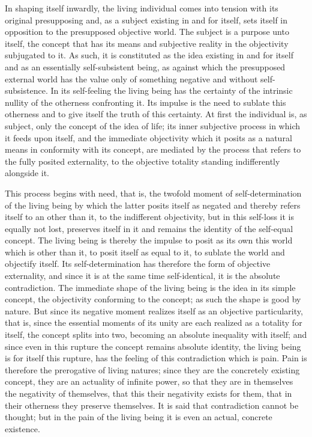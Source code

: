 In shaping itself inwardly, the living individual
comes into tension with its original presupposing
and, as a subject existing in and for itself,
sets itself in opposition to the presupposed objective world.
The subject is a purpose unto itself,
the concept that has its means and subjective reality
in the objectivity subjugated to it.
As such, it is constituted as the idea existing in and for itself
and as an essentially self-subsistent being,
as against which the presupposed external world
has the value only of something negative
and without self-subsistence.
In its self-feeling the living being
has the certainty of the intrinsic nullity
of the otherness confronting it.
Its impulse is the need to sublate this otherness
and to give itself the truth of this certainty.
At first the individual is, as subject,
only the concept of the idea of life;
its inner subjective process in which it feeds upon itself,
and the immediate objectivity which it posits as
a natural means in conformity with its concept,
are mediated by the process that refers to
the fully posited externality,
to the objective totality standing indifferently alongside it.

This process begins with need, that is,
the twofold moment of self-determination of the living being
by which the latter posits itself as negated
and thereby refers itself to an other than it,
to the indifferent objectivity,
but in this self-loss it is equally not lost,
preserves itself in it
and remains the identity of the self-equal concept.
The living being is thereby the impulse to posit
as its own this world which is other than it,
to posit itself as equal to it,
to sublate the world and objectify itself.
Its self-determination has therefore
the form of objective externality,
and since it is at the same time self-identical,
it is the absolute contradiction.
The immediate shape of the living being is
the idea in its simple concept,
the objectivity conforming to the concept;
as such the shape is good by nature.
But since its negative moment realizes itself
as an objective particularity,
that is, since the essential moments of its unity are
each realized as a totality for itself,
the concept splits into two,
becoming an absolute inequality with itself;
and since even in this rupture the concept remains absolute identity,
the living being is for itself this rupture,
has the feeling of this contradiction which is pain.
Pain is therefore the prerogative of living natures;
since they are the concretely existing concept,
they are an actuality of infinite power,
so that they are in themselves the negativity of themselves,
that this their negativity exists for them,
that in their otherness they preserve themselves.
It is said that contradiction cannot be thought;
but in the pain of the living being
it is even an actual, concrete existence.

